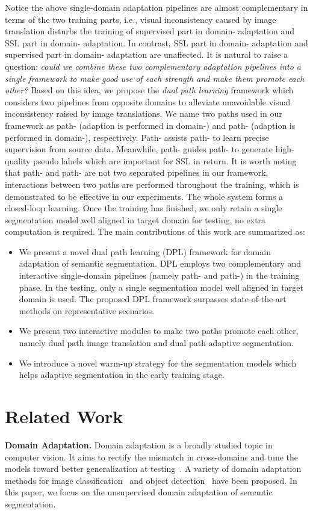 \documentclass[10pt,twocolumn,letterpaper]{article}
\begin{document}
Notice the above single-domain adaptation pipelines are almost complementary in terms of the two training parts, i.e., visual inconsistency caused by image translation disturbs the training of supervised part in domain- adaptation and SSL part in domain- adaptation. In contrast, SSL part in domain- adaptation and supervised part in domain- adaptation are unaffected. It is natural to raise a question: \emph{could we combine these two complementary adaptation pipelines into a single framework to make good use of each strength and make them promote each other?} Based on this idea, we propose the \emph{dual path learning} framework which considers two pipelines from opposite domains to alleviate unavoidable visual inconsistency raised by image translations. We name two paths used in our framework as path- (adaption is performed in domain-) and path- (adaption is performed in domain-), respectively. Path- assists path- to learn precise supervision from source data. Meanwhile, path- guides path- to generate high-quality pseudo labels which are important for SSL in return. It is worth noting that path- and path- are not two separated pipelines in our framework, interactions between two paths are performed throughout the training, which is demonstrated to be effective in our experiments. The whole system forms a closed-loop learning. Once the training has finished, we only retain a single segmentation model well aligned in target domain for testing, no extra computation is required. The main contributions of this work are summarized as:
\begin{itemize}
\item We present a novel dual path learning (DPL) framework for domain adaptation of semantic segmentation. DPL employs two complementary and interactive single-domain pipelines (namely path- and path-) in the training phase. In the testing, only a single segmentation model well aligned in target domain is used. The proposed DPL framework surpasses state-of-the-art methods on representative scenarios.
\item We present two interactive modules to make two paths promote each other, namely dual path image translation and dual path adaptive segmentation.
\item We introduce a novel warm-up strategy for the segmentation models which helps adaptive segmentation in the early training stage.
\end{itemize}

\section{Related Work}
{\noindent \textbf{Domain Adaptation.}}\hspace{3pt}
Domain adaptation is a broadly studied topic in computer vision. It aims to rectify the mismatch in cross-domains and tune the models toward better generalization at testing~\cite{patel2015visual}. A variety of domain adaptation methods for image classification~\cite{saito2017maximum,Chen_2019_CVPR,tzeng2017adversarial,kang2019contrastive} and object detection~\cite{chen2018domain,bhattacharjee2020dunit} have been proposed. In this paper, we focus on the unsupervised domain adaptation of semantic segmentation.
\end{document}

